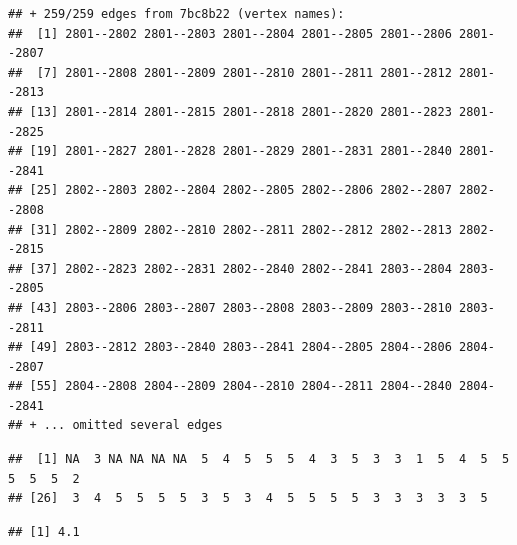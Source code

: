 \documentclass[
]{book}
\newenvironment{Shaded}{\begin{snugshade}}{\end{snugshade}}
\newcommand{\AttributeTok}[1]{\textcolor[rgb]{0.13,0.29,0.53}{#1}}
\newcommand{\CommentTok}[1]{\textcolor[rgb]{0.56,0.35,0.01}{\textit{#1}}}
\newcommand{\ConstantTok}[1]{\textcolor[rgb]{0.56,0.35,0.01}{#1}}
\newcommand{\FunctionTok}[1]{\textcolor[rgb]{0.13,0.29,0.53}{\textbf{#1}}}
\newcommand{\NormalTok}[1]{#1}
\newcommand{\SpecialCharTok}[1]{\textcolor[rgb]{0.81,0.36,0.00}{\textbf{#1}}}
\begin{document}
\begin{verbatim}
## + 259/259 edges from 7bc8b22 (vertex names):
##  [1] 2801--2802 2801--2803 2801--2804 2801--2805 2801--2806 2801--2807
##  [7] 2801--2808 2801--2809 2801--2810 2801--2811 2801--2812 2801--2813
## [13] 2801--2814 2801--2815 2801--2818 2801--2820 2801--2823 2801--2825
## [19] 2801--2827 2801--2828 2801--2829 2801--2831 2801--2840 2801--2841
## [25] 2802--2803 2802--2804 2802--2805 2802--2806 2802--2807 2802--2808
## [31] 2802--2809 2802--2810 2802--2811 2802--2812 2802--2813 2802--2815
## [37] 2802--2823 2802--2831 2802--2840 2802--2841 2803--2804 2803--2805
## [43] 2803--2806 2803--2807 2803--2808 2803--2809 2803--2810 2803--2811
## [49] 2803--2812 2803--2840 2803--2841 2804--2805 2804--2806 2804--2807
## [55] 2804--2808 2804--2809 2804--2810 2804--2811 2804--2840 2804--2841
## + ... omitted several edges
\end{verbatim}

\begin{Shaded}
\end{Shaded}

\begin{verbatim}
##  [1] NA  3 NA NA NA NA  5  4  5  5  5  4  3  5  3  3  1  5  4  5  5  5  5  5  2
## [26]  3  4  5  5  5  5  3  5  3  4  5  5  5  5  3  3  3  3  3  5
\end{verbatim}

\begin{Shaded}
\end{Shaded}

\begin{verbatim}
## [1] 4.1
\end{verbatim}

\begin{Shaded}
\end{Shaded}
\end{document}
